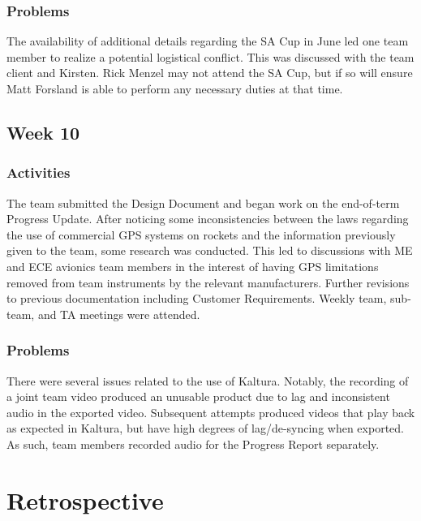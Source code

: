 \documentclass[journal,10pt,onecolumn,compsoc]{IEEEtran}
\begin{document}
		\subsubsection{Problems}
			The availability of additional details regarding the SA Cup in June led one team member to realize a potential logistical conflict.
			This was discussed with the team client and Kirsten.
			Rick Menzel may not attend the SA Cup, but if so will ensure Matt Forsland is able to perform any necessary duties at that time.
	
	\subsection{Week 10}
		
		\subsubsection{Activities}
			The team submitted the Design Document and began work on the end-of-term Progress Update.
			After noticing some inconsistencies between the laws regarding the use of commercial GPS systems on rockets and the information previously given to the team, some research was conducted.
			This led to discussions with ME and ECE avionics team members in the interest of having GPS limitations removed from team instruments by the relevant manufacturers.
			Further revisions to previous documentation including Customer Requirements.
			Weekly team, sub-team, and TA meetings were attended.
		
		\subsubsection{Problems}
			There were several issues related to the use of Kaltura.
			Notably, the recording of a joint team video produced an unusable product due to lag and inconsistent audio in the exported video.
			Subsequent attempts produced videos that play back as expected in Kaltura, but have high degrees of lag/de-syncing when exported.
			As such, team members recorded audio for the Progress Report separately.
\newpage

\section{Retrospective}
\end{document}
